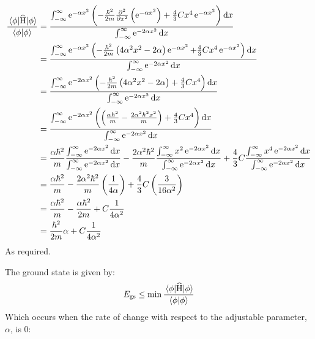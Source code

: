 \subsection{}
\begin{align*}
    \frac{\expectationvalue{\widehat{\operatorname{H}}}{\phi}}{\braket{\phi}} & = \frac{\int_{-\infty}^{\infty} \operatorname{e}^{-\alpha x^2} \del{-\frac{\hbar^2}{2m} \pd[2]{}{x} \del{\operatorname{e}^{-\alpha x^2}} + \frac{4}{3}Cx^4 \operatorname{e}^{-\alpha x^2}} \dif x}{\int_{-\infty}^{\infty} \operatorname{e}^{-2 \alpha x^2} \dif x}\\
    & = \frac{\int_{-\infty}^{\infty} \operatorname{e}^{-\alpha x^2} \del{-\frac{\hbar^2}{2m} \del{4 \alpha^2 x^2 - 2\alpha}\operatorname{e}^{-\alpha x^2} + \frac{4}{3}Cx^4 \operatorname{e}^{-\alpha x^2}} \dif x}{\int_{-\infty}^{\infty} \operatorname{e}^{-2 \alpha x^2} \dif x}\\
    & = \frac{\int_{-\infty}^{\infty} \operatorname{e}^{-2 \alpha x^2} \del{-\frac{\hbar^2}{2m} \del{4 \alpha^2 x^2 - 2\alpha} + \frac{4}{3}Cx^4} \dif x}{\int_{-\infty}^{\infty} \operatorname{e}^{-2 \alpha x^2} \dif x}\\
    & = \frac{\int_{-\infty}^{\infty} \operatorname{e}^{-2 \alpha x^2} \del{\del{\frac{\alpha \hbar^2}{m} - \frac{2 \alpha^2 \hbar^2 x^2}{m}} + \frac{4}{3}Cx^4} \dif x}{\int_{-\infty}^{\infty} \operatorname{e}^{-2 \alpha x^2} \dif x}\\
    & = \frac{\alpha \hbar^2}{m} \frac{\int_{-\infty}^{\infty} \operatorname{e}^{-2 \alpha x^2} \dif x}{\int_{-\infty}^{\infty} \operatorname{e}^{-2 \alpha x^2} \dif x} - \frac{2 \alpha^2 \hbar^2}{m} \frac{\int_{-\infty}^{\infty} x^2 \operatorname{e}^{-2 \alpha x^2} \dif x}{\int_{-\infty}^{\infty} \operatorname{e}^{-2 \alpha x^2} \dif x} + \frac{4}{3} C \frac{\int_{-\infty}^{\infty} x^4 \operatorname{e}^{-2 \alpha x^2} \dif x}{\int_{-\infty}^{\infty} \operatorname{e}^{-2 \alpha x^2} \dif x}\\
    & = \frac{\alpha \hbar^2}{m} - \frac{2 \alpha^2 \hbar^2}{m} \del{\frac{1}{4 \alpha}} + \frac{4}{3} C \del{\frac{3}{16 \alpha^2}}\\
    & = \frac{\alpha \hbar^2}{m} - \frac{\alpha \hbar^2}{2 m} + C \frac{1}{4 \alpha^2}\\
    & = \frac{\hbar^2}{2m} \alpha + C \frac{1}{4 \alpha^2}
\end{align*}
As required.

The ground state is given by:
\begin{align*}
    E_{\textrm{gs}} \leq \operatorname{min} \frac{\expectationvalue{\widehat{\operatorname{H}}}{\phi}}{\braket{\phi}}
\end{align*}
Which occurs when the rate of change with respect to the adjustable parameter, $ \alpha $, is $ 0 $:

